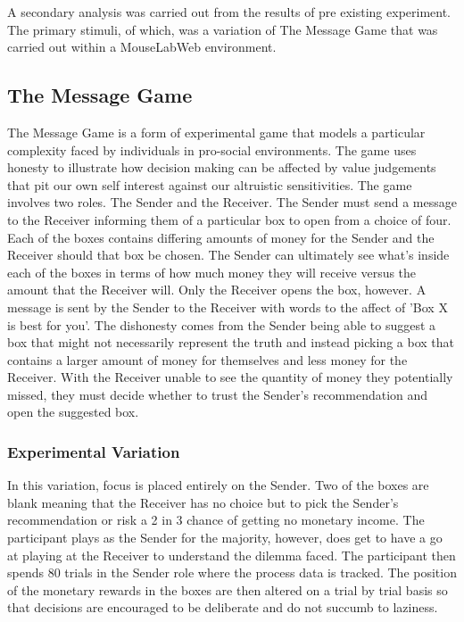 \documentclass[man, floatsintext]{apa7}
\begin{document}
A secondary analysis was carried out from the results of pre existing experiment. The primary stimuli, of which, was a variation of The Message Game that was carried out within a MouseLabWeb environment. 

\subsection{The Message Game}

The Message Game is a form of experimental game that models a particular complexity faced by individuals in pro-social environments. The game uses honesty to illustrate how decision making can be affected by value judgements that pit our own self interest against our altruistic sensitivities. 
The game involves two roles. The Sender and the Receiver. The Sender must send a message to the Receiver informing them of a particular box to open from a choice of four. Each of the boxes contains differing amounts of money for the Sender and the Receiver should that box be chosen. The Sender can ultimately see what's inside each of the boxes in terms of how much money they will receive versus the amount that the Receiver will. Only the Receiver opens the box, however. A message is sent by the Sender to the Receiver with words to the affect of 'Box X is best for you'. The dishonesty comes from the Sender being able to suggest a box that might not necessarily represent the truth and instead picking a box that contains a larger amount of money for themselves and less money for the Receiver. With the Receiver unable to see the quantity of money they potentially missed, they must decide whether to trust the Sender's recommendation and open the suggested box.

\subsubsection{Experimental Variation}

In this variation, focus is placed entirely on the Sender. Two of the boxes are blank meaning that the Receiver has no choice but to pick the Sender's recommendation or risk a 2 in 3 chance of getting no monetary income. The participant plays as the Sender for the majority, however, does get to have a go at playing at the Receiver to understand the dilemma faced. The participant then spends 80 trials in the Sender role where the process data is tracked. The position of the monetary rewards in the boxes are then altered on a trial by trial basis so that decisions are encouraged to be deliberate and do not succumb to laziness. 
\end{document}
